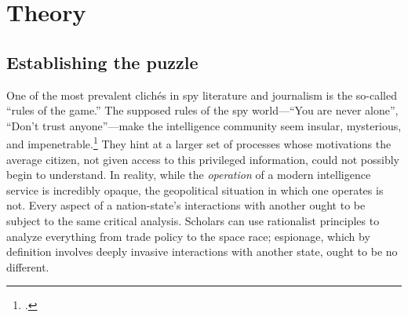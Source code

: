 \documentclass[14pt]{extarticle}
\begin{document}



\section{Theory}
\subsection{Establishing the puzzle}
One of the most prevalent clich\'es in spy literature and journalism is the so-called \enquote{rules of the game.} The supposed rules of the spy world---\enquote{You are never alone}, \enquote{Don't trust anyone}---make the intelligence community seem insular, mysterious, and impenetrable.\footcite{myre_moscow_2019} They hint at a larger set of processes whose motivations the average citizen, not given access to this privileged information, could not possibly begin to understand. In reality, while the \emph{operation} of a modern intelligence service is incredibly opaque, the geopolitical situation in which one operates is not. Every aspect of a nation-state's interactions with another ought to be subject to the same critical analysis. Scholars can use rationalist principles to analyze everything from trade policy to the space race; espionage, which by definition involves deeply invasive interactions with another state, ought to be no different.
\end{document}
